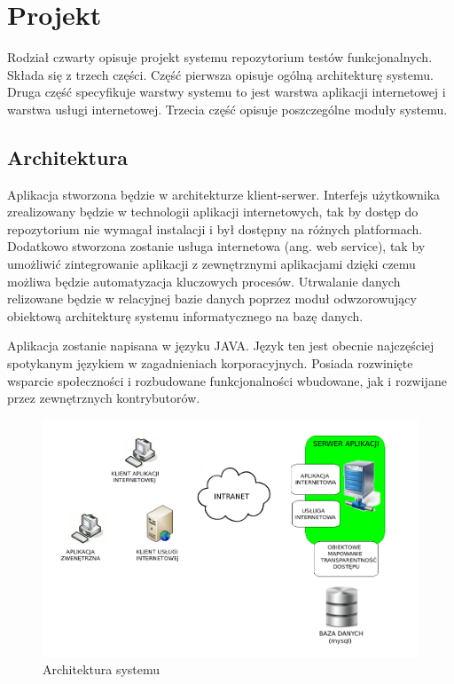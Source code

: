 \chapter{Projekt}
Rodział czwarty opisuje projekt systemu repozytorium testów funkcjonalnych. Składa się z trzech części. Część pierwsza opisuje ogólną architekturę systemu. Druga część specyfikuje warstwy systemu to jest warstwa aplikacji internetowej i warstwa usługi internetowej. Trzecia część opisuje poszczególne moduły systemu.

\section{Architektura}
Aplikacja stworzona będzie w architekturze klient-serwer. Interfejs użytkownika zrealizowany będzie w technologii aplikacji internetowych, tak by dostęp do repozytorium nie wymagał instalacji i był dostępny na różnych platformach. Dodatkowo stworzona zostanie usługa internetowa (ang. web service), tak by umożliwić zintegrowanie aplikacji z zewnętrznymi aplikacjami dzięki czemu możliwa będzie automatyzacja kluczowych procesów. Utrwalanie danych relizowane będzie w relacyjnej bazie danych poprzez moduł odwzorowujący obiektową architekturę systemu informatycznego na bazę danych.

Aplikacja zostanie napisana w języku JAVA. Język ten jest obecnie najczęściej spotykanym językiem w zagadnieniach korporacyjnych. Posiada rozwinięte wsparcie społeczności i rozbudowane funkcjonalności wbudowane, jak i rozwijane przez zewnętrznych kontrybutorów. 
\begin{figure}[h]
\centerline{\includegraphics[scale=0.45]{img/architektura.png}}
\caption{Architektura systemu}
\label{fig:architektura}
\end{figure}


